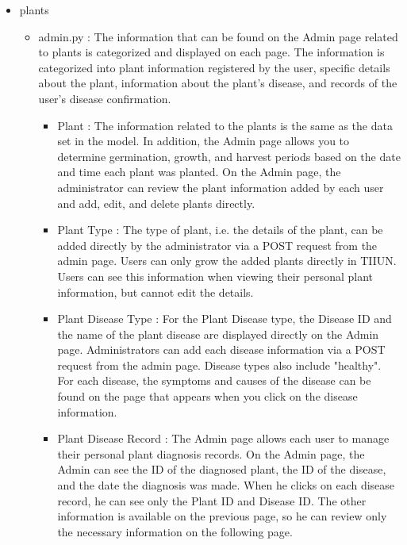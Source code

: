 \documentclass[conference, a4paper]{IEEEtran}
\begin{document}
\begin{enumerate}
\begin{itemize}
    \item plants
    \begin{itemize}
        \item admin.py : The information that can be found on the Admin page related to plants is categorized and displayed on each page. The information is categorized into plant information registered by the user, specific details about the plant, information about the plant's disease, and records of the user's disease confirmation. \\
        \begin{itemize}
            \item Plant : The information related to the plants is the same as the data set in the model. In addition, the Admin page allows you to determine germination, growth, and harvest periods based on the date and time each plant was planted. On the Admin page, the administrator can review the plant information added by each user and add, edit, and delete plants directly. \\
            \item Plant Type : The type of plant, i.e. the details of the plant, can be added directly by the administrator via a POST request from the admin page. Users can only grow the added plants directly in TIIUN. Users can see this information when viewing their personal plant information, but cannot edit the details. \\
            \item Plant Disease Type : For the Plant Disease type, the Disease ID and the name of the plant disease are displayed directly on the Admin page. Administrators can add each disease information via a POST request from the admin page. Disease types also include "healthy". For each disease, the symptoms and causes of the disease can be found on the page that appears when you click on the disease information. \\
            \item Plant Disease Record : The Admin page allows each user to manage their personal plant diagnosis records. On the Admin page, the Admin can see the ID of the diagnosed plant, the ID of the disease, and the date the diagnosis was made. When he clicks on each disease record, he can see only the Plant ID and Disease ID. The other information is available on the previous page, so he can review only the necessary information on the following page.
        \end{itemize}


\end{itemize}
\end{itemize}
\end{enumerate}
\end{document}
